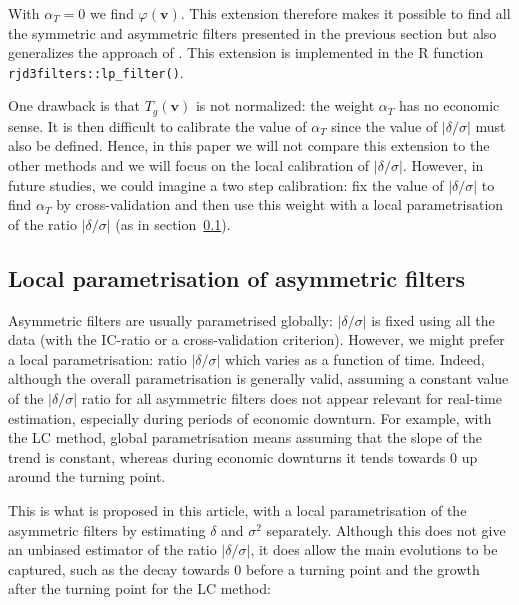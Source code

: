 \documentclass[
]{article}
\newcommand\1{\mathds{1}}
\begin{document}
With \(\alpha_T=0\) we find \(\varphi(\boldsymbol v)\). This extension
therefore makes it possible to find all the symmetric and asymmetric
filters presented in the previous section but also generalizes the
approach of \textcite{GrayThomson1996}. This extension is implemented in
the R function \texttt{rjd3filters::lp\_filter()}.

One drawback is that \(T_g(\boldsymbol v)\) is not normalized: the
weight \(\alpha_T\) has no economic sense. It is then difficult to
calibrate the value of \(\alpha_T\) since the value of
\(\lvert\delta/\sigma\rvert\) must also be defined. Hence, in this paper
we will not compare this extension to the other methods and we will
focus on the local calibration of \(\lvert\delta/\sigma\rvert\).
However, in future studies, we could imagine a two step calibration: fix
the value of \(\lvert\delta/\sigma\rvert\) to find \(\alpha_T\) by
cross-validation and then use this weight with a local parametrisation
of the ratio \(\lvert\delta/\sigma\rvert\) (as in
section~\ref{sec-localic}).

\subsection{Local parametrisation of asymmetric
filters}\label{sec-localic}

Asymmetric filters are usually parametrised globally:
\(\lvert\delta/\sigma\rvert\) is fixed using all the data (with the
IC-ratio or a cross-validation criterion). However, we might prefer a
local parametrisation: ratio \(\lvert\delta/\sigma\rvert\) which varies
as a function of time. Indeed, although the overall parametrisation is
generally valid, assuming a constant value of the
\(\lvert\delta/\sigma\rvert\) ratio for all asymmetric filters does not
appear relevant for real-time estimation, especially during periods of
economic downturn. For example, with the LC method, global
parametrisation means assuming that the slope of the trend is constant,
whereas during economic downturns it tends towards 0 up around the
turning point.

This is what is proposed in this article, with a local parametrisation
of the asymmetric filters by estimating \(\delta\) and \(\sigma^2\)
separately. Although this does not give an unbiased estimator of the
ratio \(\lvert\delta/\sigma\rvert\), it does allow the main evolutions
to be captured, such as the decay towards 0 before a turning point and
the growth after the turning point for the LC method:
\end{document}

